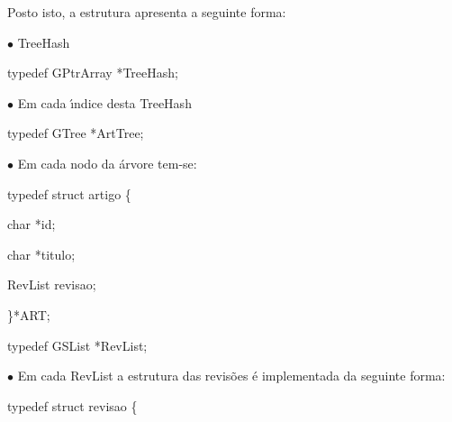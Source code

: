 \documentclass[a4paper,portrait,12pt]{article}
\begin{document}
\begin{flushleft}
Posto isto, a estrutura apresenta a seguinte forma:
\end{flushleft}





\begin{flushleft}
$\bullet$ TreeHash
\end{flushleft}


\begin{flushleft}
typedef GPtrArray *TreeHash;
\end{flushleft}


\begin{flushleft}
$\bullet$ Em cada \i{}́ndice desta TreeHash
\end{flushleft}


\begin{flushleft}
typedef GTree *ArtTree;
\end{flushleft}


\begin{flushleft}
$\bullet$ Em cada nodo da árvore tem-se:
\end{flushleft}


\begin{flushleft}
typedef struct artigo \{
\end{flushleft}


\begin{flushleft}
char *id;
\end{flushleft}


\begin{flushleft}
char *titulo;
\end{flushleft}


\begin{flushleft}
RevList revisao;
\end{flushleft}


\begin{flushleft}
\}*ART;
\end{flushleft}





\begin{flushleft}
typedef GSList *RevList;
\end{flushleft}


\begin{flushleft}
$\bullet$ Em cada RevList a estrutura das revisões é implementada da seguinte forma:
\end{flushleft}


\begin{flushleft}
typedef struct revisao \{
\end{flushleft}
\end{document}
